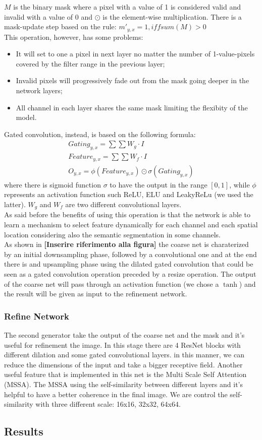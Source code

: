 \documentclass[10pt,twocolumn,letterpaper]{article}
\begin{document}
	\(M\) is the binary mask where a pixel with a value of 1 is considered valid and invalid with a value of 0 and \(\odot\) is the element-wise multiplication.
	There is a mask-update step based on the rule: \(m'_{y,x} = 1, iff sum(M) > 0\)
	\\
	This operation, however, has some problems:
	\begin{itemize}
		\item 
		It will set to one a pixel in next layer no matter the number of 1-value-pixels covered by the filter range in the previous layer;
		\item
		Invalid pixels will progressively fade out from the mask going deeper in the network layers;
		\item
		All channel in each layer shares the same mask limiting the flexibity of the model.
	\end{itemize}
	Gated convolution, instead, is based on the following formula:
	\begin{gather}
		Gating_{y,x} = \sum \sum W_g \cdot I \\
		Feature_{y,x} = \sum \sum W_f \cdot I \\
		O_{y,x} = \phi (Feature_{y,x}) \odot \sigma (Gating_{y,x})
	\end{gather}
	where there is sigmoid function \(\sigma\) to have the output in the range \([0,1]\), while \(\phi\) represents an activation function such ReLU, ELU and LeakyReLu (we used the latter). \(W_g\) and \(W_f\) are two different convolutional layers.
	\\
	As said before the benefits of using this operation is that the network is able to learn a mechanism to select feature dynamically for each channel and each spatial location considering also the semantic segmentation in some channels.
	\\
	As shown in \textbf{[Inserire riferimento alla figura]} the coarse net is charaterized by an initial downsampling phase, followed by a convolutional one and at the end there is and upsampling phase using the dilated gated convolution that could be seen as a gated convolution operation preceded by a resize operation. The output of the coarse net will pass through an activation function (we chose a \(\tanh\)) and the result will be given as input to the refinement network.
	\subsubsection{Refine Network}
	The second generator take the output of the coarse net and the mask and it's useful for refinement the image.
	In this stage there are 4 ResNet blocks with different dilation and some gated convolutional layers. in this manner, we can reduce the dimensions of the input and take a bigger receptive field. Another useful feature that is implemented in this net is the Multi Scale Self Attention (MSSA). The MSSA using the self-similarity between different layers and it's helpful to have a better coherence in the final image. We are control the self-similarity with three different scale: 16x16, 32x32, 64x64.
	
	
	\subsection{Results}
	
	
	
	{\small
		
		
	}
	
\end{document}
